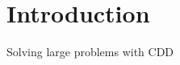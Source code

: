 
\chapter*{Introduction}\label{chap:Introduction}  
{}

Solving large problems with \gls{CDD}

\clearpage



